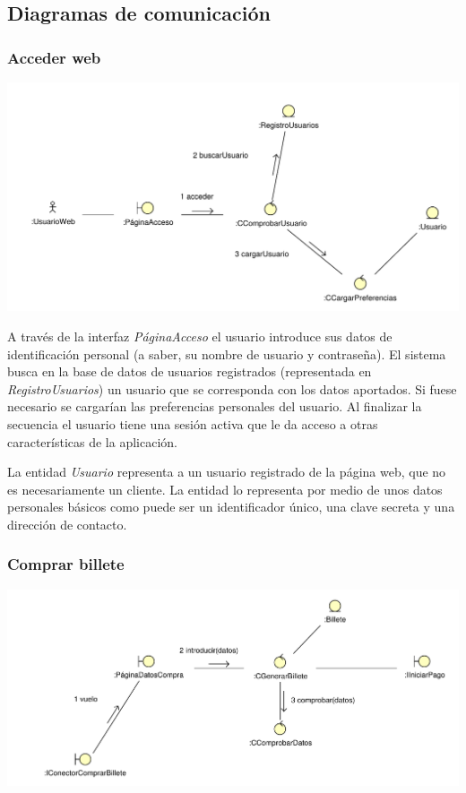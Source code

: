 \documentclass[11pt, a4paper, twoside, titlepage]{article}
\begin{document}
		\subsection{Diagramas de comunicación}
			\subsubsection{Acceder web}
				\begin{center}
					\includegraphics[scale=.75]{analisis/diagramas/accederweb.pdf}
				\end{center}

				A través de la interfaz {\itshape PáginaAcceso} el usuario introduce sus datos de identificación personal (a saber, su nombre de usuario y contraseña). El sistema busca en la base de datos de usuarios registrados (representada en {\itshape RegistroUsuarios}) un usuario que se corresponda con los datos aportados. Si fuese necesario se cargarían las preferencias personales del usuario. Al finalizar la secuencia el usuario tiene una sesión activa que le da acceso a otras características de la aplicación.

				La entidad {\itshape Usuario} representa a un usuario registrado de la página web, que no es necesariamente un cliente. La entidad lo representa por medio de unos datos personales básicos como puede ser un identificador único, una clave secreta y una dirección de contacto.

			\subsubsection{Comprar billete}
				\begin{center}
					\includegraphics[scale=.72]{analisis/diagramas/comprarbillete.pdf}
				\end{center}
\end{document}

